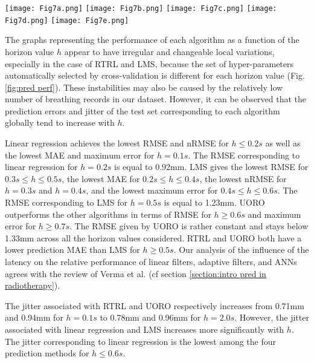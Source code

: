 \documentclass[twocolumn,a4paper]{svjour3} \sloppy          \smartqed
\begin{document}
\begin{figure*}[tb!]
    \centering
    \texttt{[image: Fig7a.png]}\qquad
    \texttt{[image: Fig7b.png]}\qquad
    \texttt{[image: Fig7c.png]}\qquad
    \texttt{[image: Fig7d.png]}\qquad
    \texttt{[image: Fig7e.png]}\caption{Forecasting performance of each algorithm as a function of the prediction horizon. Each point corresponds to the average of one performance measure of the test set across the 9 sequences. }
    \label{fig:pred perf}
\end{figure*}

The graphs representing the performance of each algorithm as a function of the horizon value $h$ appear to have irregular and changeable local variations, especially in the case of RTRL and LMS, because the set of hyper-parameters automatically selected by cross-validation is different for each horizon value (Fig. \ref{fig:pred perf}). These instabilities may also be caused by the relatively low number of breathing records in our dataset. However, it can be observed that the prediction errors and jitter of the test set corresponding to each algorithm globally tend to increase with $h$. 

Linear regression achieves the lowest RMSE and nRMSE for $h \leq 0.2s$ as well as the lowest MAE and maximum error for $h = 0.1s$. The RMSE corresponding to linear regression for $h=0.2s$ is equal to 0.92mm. LMS gives the lowest RMSE for $ 0.3s \leq h \leq 0.5s$, the lowest MAE for $ 0.2s \leq h \leq 0.4s$, the lowest nRMSE for $h = 0.3s$ and $h = 0.4s$, and the lowest maximum error for $ 0.4s \leq h \leq 0.6s$. The RMSE corresponding to LMS for $h=0.5s$ is equal to 1.23mm. UORO outperforms the other algorithms in terms of RMSE for $h \geq 0.6s$ and maximum error for $h \geq 0.7s$. The RMSE given by UORO is rather constant and stays below 1.33mm across all the horizon values considered. RTRL and UORO both have a lower prediction MAE than LMS for $h \geq 0.5s$. Our analysis of the influence of the latency on the relative performance of linear filters, adaptive filters, and ANNs agrees with the review of Verma et al. \cite{verma2010survey} (cf section \ref{section:intro pred in radiotherapy}).

The jitter associated with RTRL and UORO respectively increases from 0.71mm and 0.94mm for $h=0.1s$ to 0.78mm and 0.96mm for $h=2.0s$. However, the jitter associated with linear regression and LMS increases more significantly with $h$. The jitter corresponding to linear regression is the lowest among the four prediction methods for $h \leq 0.6s$.
\end{document}
